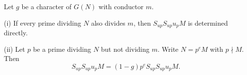 Let $g$ be a character of $G(N)$ with conductor $m$.

(i) If every prime dividing $N$ also divides $m$, then $S_{up} S_{up} u_p M$ is determined directly.

(ii) Let $p$ be a prime dividing $N$ but not dividing $m$. Write $N = p^e M$ with $p \nmid M$. Then
$$S_{up} S_{up} u_p M = (1 - g) p^e S_{up} S_{up} u_p M.$$
